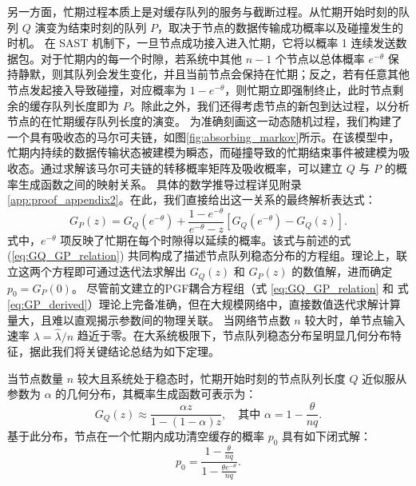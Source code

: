 另一方面，忙期过程本质上是对缓存队列的服务与截断过程。从忙期开始时刻的队列 $Q$ 演变为结束时刻的队列 $P$，取决于节点的数据传输成功概率以及碰撞发生的时机。
在 SAST 机制下，一旦节点成功接入进入忙期，它将以概率 1 连续发送数据包。对于忙期内的每一个时隙，若系统中其他 $n-1$ 个节点以总体概率 $e^{-\theta}$ 保持静默，则其队列会发生变化，并且当前节点会保持在忙期；反之，若有任意其他节点发起接入导致碰撞，对应概率为 $1-e^{-\theta}$，则忙期立即强制终止，此时节点剩余的缓存队列长度即为 $P$。除此之外，我们还得考虑节点的新包到达过程，以分析节点的在忙期缓存队列长度的演变。
为准确刻画这一动态随机过程，我们构建了一个具有吸收态的马尔可夫链\cite{2008_Markov_absorb}，如图\ref{fig:absorbing_markov}所示。在该模型中，忙期内持续的数据传输状态被建模为瞬态，而碰撞导致的忙期结束事件被建模为吸收态。通过求解该马尔可夫链的转移概率矩阵及吸收概率，可以建立 $Q$ 与 $P$ 的概率生成函数之间的映射关系。
具体的数学推导过程详见附录\ref{app:proof_appendix2}。在此，我们直接给出这一关系的最终解析表达式：
\begin{equation}
	\label{eq:GP_derived}
	G_P(z) = G_Q(e^{-\theta}) + \frac{1 - e^{-\theta}}{e^{-\theta} - z} \left[ G_Q(e^{-\theta}) - G_Q(z) \right].
\end{equation}
式中，$e^{-\theta}$ 项反映了忙期在每个时隙得以延续的概率。该式与前述的式 (\ref{eq:GQ_GP_relation}) 共同构成了描述节点队列稳态分布的方程组。理论上，联立这两个方程即可通过迭代法求解出 $G_Q(z)$ 和 $G_P(z)$ 的数值解，进而确定 $p_0 = G_P(0)$。
尽管前文建立的PGF耦合方程组（式 \ref{eq:GQ_GP_relation} 和 式 \ref{eq:GP_derived}）理论上完备准确，但在大规模网络中，直接数值迭代求解计算量大，且难以直观揭示参数间的物理关联。
当网络节点数 $n$ 较大时，单节点输入速率 $\lambda = \hat{\lambda}/n$ 趋近于零。在大系统极限下，节点队列稳态分布呈明显几何分布特征，据此我们将关键结论总结为如下定理。

\begin{theorem}
	\label{thm:geometric_Q}
	当节点数量 $n$ 较大且系统处于稳态时，忙期开始时刻的节点队列长度 $Q$ 近似服从参数为 $\alpha$ 的几何分布，其概率生成函数可表示为：
	\begin{equation}
		G_Q(z) \approx \frac{\alpha z}{1 - (1 - \alpha) z}, \quad \text{其中 } \alpha = 1 - \frac{\theta}{n q}.
	\end{equation}
	基于此分布，节点在一个忙期内成功清空缓存的概率 $p_0$ 具有如下闭式解：
	\begin{equation}
		\label{eq:p0_closed_form_1}
		p_0 = \frac{1 - \frac{\theta}{n q}}{1 - \frac{\theta e^{-\theta}}{n q}}.
	\end{equation}
\end{theorem}


